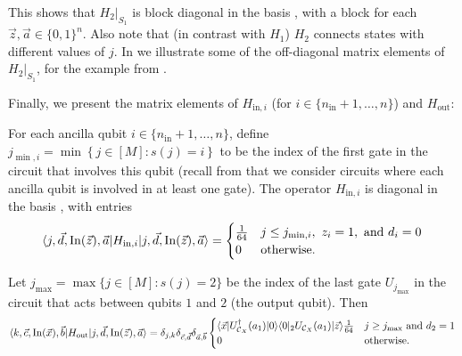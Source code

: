 \documentclass[../thesis-main/thesis-main]{subfiles}
\begin{document}
This shows that $H_{2}|_{S_{1}}$ is block diagonal in the basis , with a block for
each $\vec{z},\vec{a}\in\{0,1\}^{n}$. Also note that (in contrast
with $H_{1}$) $H_{2}$ connects states with different values of $j$.
In  we illustrate some of the off-diagonal
matrix elements of $H_{2}|_{S_{1}}$, for the example from .

Finally, we present the matrix elements of $H_{\text{in},i}$ (for
$i\in\{n_{\text{in}}+1,\ldots,n\}$) and $H_{\text{out}}$:

\begin{mdframed}[frametitle=Matrix elements of $H_{\text{in},i}$]
For each ancilla qubit $i\in\{n_{\text{in}}+1,\ldots,n\}$, define  $j_{\min,i}=\min\left\{ j\in[M]\colon s(j)=i\right\}$ to be the index of the first gate in the circuit that involves this qubit (recall from  that we consider circuits where each ancilla qubit is involved in at least one gate). The operator $H_{\text{in},i}$ is diagonal in the basis , with entries
\begin{equation}
\langle j,\vec{d},\operatorname{In}(\vec{z}),\vec{a}|H_{\text{in},i}|j,\vec{d},\operatorname{In}(\vec{z}),\vec{a}\rangle=\begin{cases}
\frac{1}{64} & j\leq j_{\min,i},\text{ }z_{i}=1,\text{ and }d_{i}=0\\
0 & \text{otherwise.}
\end{cases}\label{eq:Hin_mat_els}
\end{equation}
\end{mdframed}

\begin{mdframed}[frametitle=Matrix elements of $H_{\text{out}}$]
Let $j_{\max}=\max\{j\in[M]\colon s(j)=2\}$ be the index of the last gate $U_{j_{\max}}$ in the circuit that acts between qubits $1$ and $2$ (the output qubit). Then
\begin{equation}
\langle k,\vec{c},\operatorname{In}(\vec{x}),\vec{b}|H_{\text{out}}|j,\vec{d},\operatorname{In}(\vec{z}),\vec{a}\rangle=\delta_{j,k}\delta_{\vec{c},\vec{d}}\delta_{\vec{a},\vec{b}}\begin{cases}
\langle\vec{x}|U_{\mathcal{C}_X}^{\dagger}(a_{1})|0\rangle\langle0|_{2}U_{\mathcal{C}_X}(a_{1})|\vec{z}\rangle\frac{1}{64} & j\geq j_{\max}\text{ and }d_{2}=1\\
0 & \text{otherwise}.
\end{cases}\label{eq:hout_matels-1}
\end{equation}
\end{mdframed}
\end{document}

